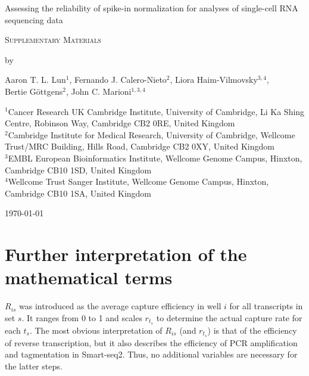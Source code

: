 \documentclass{article}
\begin{document}
\begin{titlepage}
\vspace*{3cm}
\begin{center}

{\LARGE
Assessing the reliability of spike-in normalization for analyses of single-cell RNA sequencing data
\par}

\vspace{0.75cm}

{\Large 
    \textsc{Supplementary Materials}
\par
}
\vspace{0.75cm}

\large
by


\vspace{0.75cm}
Aaron T. L. Lun$^1$, Fernando J. Calero-Nieto$^2$, Liora Haim-Vilmovsky$^{3,4}$, \\
Bertie G\"ottgens$^2$, John C. Marioni$^{1,3,4}$

\vspace{1cm}
\begin{minipage}{0.9\textwidth}
\begin{flushleft} 
$^1$Cancer Research UK Cambridge Institute, University of Cambridge, Li Ka Shing Centre, Robinson Way, Cambridge CB2 0RE, United Kingdom \\[6pt]
$^2$Cambridge Institute for Medical Research,  University of Cambridge, Wellcome Trust/MRC Building, Hills Road, Cambridge CB2 0XY, United Kingdom \\[6pt]
$^3$EMBL European Bioinformatics Institute, Wellcome Genome Campus, Hinxton, Cambridge CB10 1SD, United Kingdom \\[6pt]
$^4$Wellcome Trust Sanger Institute, Wellcome Genome Campus, Hinxton, Cambridge CB10 1SA, United Kingdom \\[6pt]
\end{flushleft}
\end{minipage}

\vspace{1.5cm}
{\large \today{}}

\vspace*{\fill}
\end{center}
\end{titlepage}

\newcommand\variance{\mbox{var}}

\section{Further interpretation of the mathematical terms}
$R_{is}$ was introduced as the average capture efficiency in well $i$ for all transcripts in set $s$.
It ranges from 0 to 1 and scales $r_{t_s}$ to determine the actual capture rate for each $t_s$.
The most obvious interpretation of $R_{is}$ (and $r_{t_s}$) is that of the efficiency of reverse transcription, but it also describes the efficiency of PCR amplification and tagmentation in Smart-seq2.
Thus, no additional variables are necessary for the latter steps.
\end{document}
